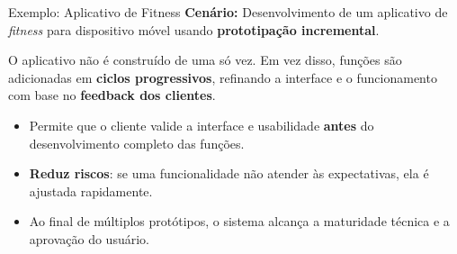\documentclass[9pt]{beamer}
\begin{document}
\begin{frame}{Exemplo: Aplicativo de Fitness}
  \textbf{Cenário:} Desenvolvimento de um aplicativo de \textit{fitness} para dispositivo móvel usando \textbf{prototipação incremental}.

  \vspace{0.4cm}
  O aplicativo não é construído de uma só vez. Em vez disso, funções são adicionadas em \textbf{ciclos progressivos}, refinando a interface e o funcionamento com base no \textbf{feedback dos clientes}.

  \vspace{0.3cm}
  \begin{itemize}
    \item Permite que o cliente valide a interface e usabilidade \textbf{antes} do desenvolvimento completo das funções.
    \item \textbf{Reduz riscos}: se uma funcionalidade não atender às expectativas, ela é ajustada rapidamente.
    \item Ao final de múltiplos protótipos, o sistema alcança a maturidade técnica e a aprovação do usuário.
  \end{itemize}
\end{frame}
\end{document}
